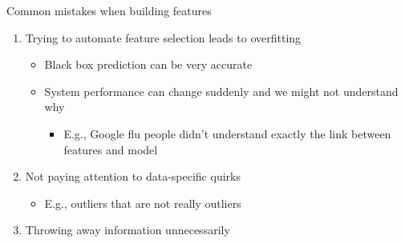 \documentclass[aspectratio=169, xcolor=dvipsnames]{beamer}
\begin{document}
  \begin{frame}{Common mistakes when building features}
    \begin{enumerate}
      \def\labelenumi{\arabic{enumi}.}

      \item Trying to automate feature selection leads to overfitting
        \begin{itemize}
          \item Black box prediction can be very accurate

          \item System performance can change suddenly and we might not understand
            why
            \begin{itemize}
              \item E.g., Google flu people didn't understand exactly the link between
                features and model
            \end{itemize}
        \end{itemize}

      \item Not paying attention to data-specific quirks
        \begin{itemize}
          \item E.g., outliers that are not really outliers
        \end{itemize}

      \item Throwing away information unnecessarily
    \end{enumerate}
  \end{frame}
\end{document}
